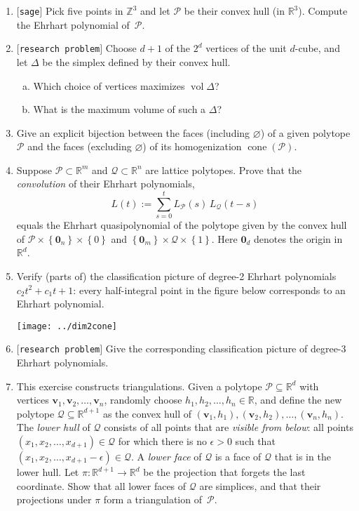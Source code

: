 \documentclass[11pt]{article}
\def\bv{\mathbf{v}}
\def\0{\mathbf{0}}
\def\cP{\mathcal{P}}
\def\cQ{\mathcal{Q}}
\def\RR{\mathbb{R}}
\def\ZZ{\mathbb{Z}}
\newcommand\cone{\operatorname{cone}}
\newcommand\vol{\operatorname{vol}}
\def\open{$[${\tt research problem}$]$ }
\def\sage{$[${\tt sage}$]$ }
\begin{document}
\begin{enumerate}[(1)]
\item \sage Pick five points in $\ZZ^3$ and let $\cP$ be their convex hull (in $\RR^3$). Compute the Ehrhart polynomial of~$\cP$.

\item \open
Choose $d+1$ of the $2^d$ vertices of the unit $d$-cube, and let $\Delta$ be the simplex defined by their convex hull.
\begin{enumerate}[(a)]
\item Which choice of vertices maximizes $\vol \Delta$?
\item What is the maximum volume of such a $\Delta$?
\end{enumerate}

\item Give an explicit bijection between the faces (including $\varnothing$) of a
given polytope $\cP$ and the faces (excluding $\varnothing$) of its homogenization
$\cone(\cP)$.

\item Suppose $\cP \subset \RR^m$ and $\cQ \subset \RR^n$ are lattice polytopes.
Prove that the \emph{convolution} of their Ehrhart polynomials,
\[
  L(t) := \sum_{ s=0 }^t L_\cP(s) \, L_\cQ(t-s)
\]
equals the Ehrhart quasipolynomial of the polytope given by the convex hull of $\cP
\times \left\{ \0_n \right\} \times \left\{ 0 \right\}$ and $\left\{ \0_m \right\}
\times \cQ \times \left\{ 1 \right\} $. Here $\0_d$ denotes the origin in $\RR^d$.

\item Verify (parts of) the classification picture of degree-2 Ehrhart polynomials $c_2 t^2 + c_1 t + 1$: every
half-integral point in the figure below corresponds to an Ehrhart polynomial.

\begin{center}
\texttt{[image: ../dim2cone]}
\end{center}

\item \open Give the corresponding classification picture of degree-3 Ehrhart polynomials. 
 

\item This exercise constructs triangulations.
Given a polytope $\cP \subseteq \RR^d$ with vertices $\bv_1, \bv_2, \dots, \bv_n$, randomly choose $h_1, h_2,
\dots, h_n \in \RR$, and define the new polytope $\cQ \subseteq \RR^{ d+1 }$ as the convex hull of
$(\bv_1, h_1), (\bv_2, h_2), \dots, (\bv_n, h_n)$.
The \emph{lower hull} of $\cQ$ consists of all points that are \emph{visible from below}: all points $(x_1, x_2, \dots, x_{ d+1 }) \in \cQ$ for which there is no $\epsilon > 0$ such that $(x_1, x_2, \dots, x_{ d+1 } - \epsilon) \in \cQ$.
A \emph{lower face} of $\cQ$ is a face of $\cQ$ that is in the lower hull.
Let $\pi : \RR^{ d+1 } \to \RR^d$ be the projection that forgets the last coordinate. 
Show that all lower faces of $\cQ$ are simplices, and that their projections under $\pi$ form a triangulation of~$\cP$.

\end{enumerate}
\end{document}

